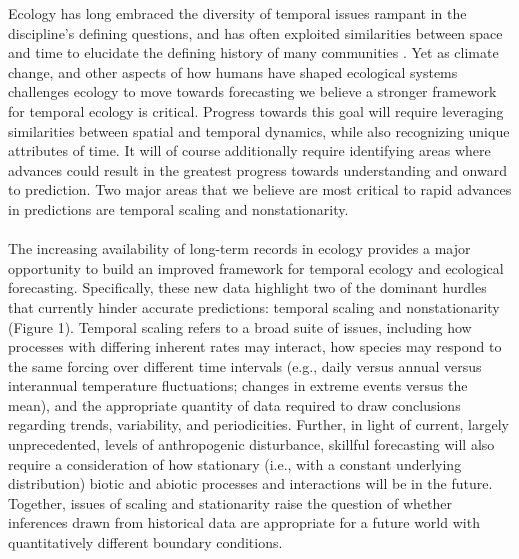 \documentclass[11pt,a4paper,oneside]{article}
\begin{document}
Ecology has long embraced the diversity of temporal issues rampant in the discipline's defining questions, and has often exploited similarities between space and time to elucidate the defining history of many communities \citep{wiens1986}. Yet as climate change, and other aspects of how humans have shaped ecological systems challenges ecology to move towards forecasting we believe a stronger framework for temporal ecology is critical. Progress towards this goal will require leveraging similarities between spatial and temporal dynamics, while also recognizing unique attributes of time. It will of course additionally require identifying areas where advances could result in the greatest progress towards understanding and onward to prediction. Two major areas that we believe are most critical to rapid advances in predictions are temporal scaling and nonstationarity. \\

\\

The increasing availability of long-term records in ecology provides a major opportunity to build an improved framework for temporal ecology and ecological forecasting. Specifically, these new data highlight two of the dominant hurdles that currently hinder accurate predictions: temporal scaling and nonstationarity (Figure 1). Temporal scaling refers to a broad suite of issues, including how processes with differing inherent rates may interact, how species may respond to the same forcing over different time intervals (e.g., daily versus annual versus interannual temperature fluctuations; changes in extreme events versus the mean), and the appropriate quantity of data required to draw conclusions regarding trends, variability, and periodicities. Further, in light of current, largely unprecedented, levels of anthropogenic disturbance, skillful forecasting will also require a consideration of how stationary (i.e., with a constant underlying distribution) biotic and abiotic processes and interactions will be in the future. Together, issues of scaling and stationarity raise the question of whether inferences drawn from historical data are appropriate for a future world with quantitatively different boundary conditions.\\
\end{document}

